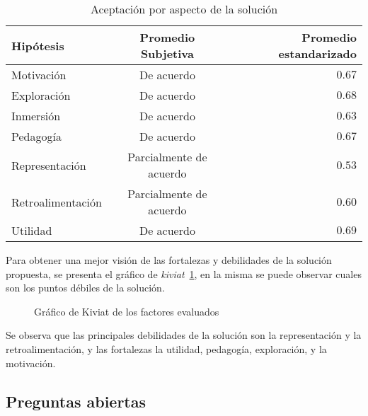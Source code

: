 \begin{table}[!hbt]
\centering
\begin{tabular}{lcr}
\toprule
Hipótesis         & Promedio Subjetiva      & Promedio estandarizado \\
\midrule
Motivación        & De acuerdo              & $0.67$  \\
Exploración       & De acuerdo              & $0.68$  \\
Inmersión         & De acuerdo              & $0.63$  \\
Pedagogía         & De acuerdo              & $0.67$  \\
Representación    & Parcialmente de acuerdo & $0.53$  \\
Retroalimentación & Parcialmente de acuerdo & $0.60$  \\
Utilidad          & De acuerdo              & $0.69$  \\
\bottomrule
\end{tabular}
\caption{Aceptación por aspecto de la solución}
\label{tab:resultado_resumen_aspectos_aceptacion}
\end{table}

Para  obtener una mejor visión de las fortalezas y debilidades de la solución
propuesta, se presenta el gráfico de \emph{kiviat}~\ref{fig:subjetiva_kiviat},
en la misma se puede observar cuales son los puntos débiles de la solución.

\begin{figure}[!ht]
\label{fig:subjetiva_kiviat}
\caption{Gráfico de Kiviat de los factores evaluados}
\end{figure}

Se observa que las principales debilidades de la solución son la representación
y la retroalimentación, y las fortalezas la utilidad, pedagogía, exploración, y
la motivación.

\subsection{Preguntas abiertas}
\label{sec:res_subjetiva_abiertas}

